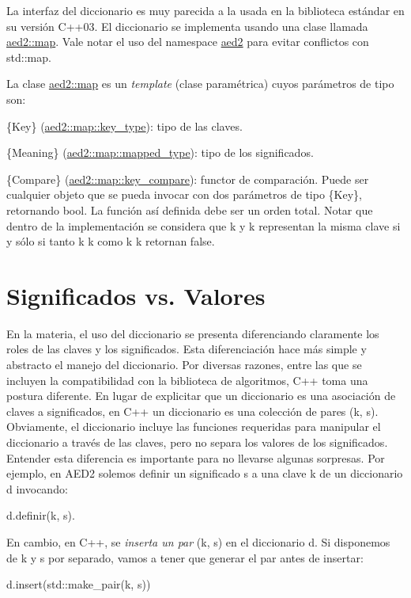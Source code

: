 La interfaz del diccionario es muy parecida a la usada en la biblioteca estándar en su versión C++03. El diccionario se implementa usando una clase llamada \hyperlink{classaed2_1_1map}{aed2\+::map}. Vale notar el uso del namespace \hyperlink{namespaceaed2}{aed2} para evitar conflictos con std\+::map.

La clase \hyperlink{classaed2_1_1map}{aed2\+::map} es un {\itshape template} (clase paramétrica) cuyos parámetros de tipo son\+:
\begin{DoxyItemize}
\item \{Key\} (\hyperlink{classaed2_1_1map_a4273e8812e7105a618df58a2c8b72b7d}{aed2\+::map\+::key\+\_\+type})\+: tipo de las claves.
\item \{Meaning\} (\hyperlink{classaed2_1_1map_aa3e34bf624f3009884a71b18f4ddae40}{aed2\+::map\+::mapped\+\_\+type})\+: tipo de los significados.
\item \{Compare\} (\hyperlink{classaed2_1_1map_a3efa081d3379ab76f33a5ef9fe697523}{aed2\+::map\+::key\+\_\+compare})\+: functor de comparación. Puede ser cualquier objeto que se pueda invocar con dos parámetros de tipo \{Key\}, retornando {\ttfamily bool}. La función  así definida debe ser un orden total. Notar que dentro de la implementación se considera que {\ttfamily k} y {\ttfamily k\textquotesingle{}} representan la misma clave si y sólo si tanto {\ttfamily k}  {\ttfamily k\textquotesingle{}} como {\ttfamily k\textquotesingle{}}  {\ttfamily k} retornan {\ttfamily false}.
\end{DoxyItemize}\hypertarget{Interfaz_Diferencias}{}\section{Significados vs. Valores}\label{Interfaz_Diferencias}
En la materia, el uso del diccionario se presenta diferenciando claramente los roles de las claves y los significados. Esta diferenciación hace más simple y abstracto el manejo del diccionario. Por diversas razones, entre las que se incluyen la compatibilidad con la biblioteca de algoritmos, C++ toma una postura diferente. En lugar de explicitar que un diccionario es una asociación de claves a significados, en C++ un diccionario es una colección de pares {\ttfamily (k, s)}. Obviamente, el diccionario incluye las funciones requeridas para manipular el diccionario a través de las claves, pero no separa los valores de los significados. Entender esta diferencia es importante para no llevarse algunas sorpresas. Por ejemplo, en A\+E\+D2 solemos definir un significado {\ttfamily s} a una clave {\ttfamily k} de un diccionario {\ttfamily d} invocando\+: 
\begin{DoxyCode}
d.definir(k, s).
\end{DoxyCode}
 En cambio, en C++, se {\itshape inserta un par} {\ttfamily (k, s)} en el diccionario {\ttfamily d}. Si disponemos de {\ttfamily k} y {\ttfamily s} por separado, vamos a tener que generar el par antes de insertar\+: 
\begin{DoxyCode}
d.insert(std::make\_pair(k, s))
\end{DoxyCode}


